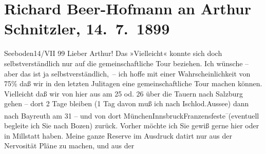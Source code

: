 

               \section[Richard Beer-Hofmann an Arthur Schnitzler, 14. 7. 1899]{ Richard Beer-Hofmann an Arthur Schnitzler, 14. 7. 1899}\nopagebreak{}\rehead{ }\begin{ledgroupsized}[t]{13cm}\normalsize\beginnumbering{} \toendnotes[C]{\smallbreak\pagebreak[2]} 
\toendnotes[C]{\smallbreak}\pstart
           \centering{}{\pb}Seeboden14/VII 99\pend
           \pstart
           Lieber Arthur! Das »Vielleicht« konnte sich doch selbstverständlich
               nur auf die gemeinschaftliche Tour beziehen. Ich wünsche – aber das ist ja
               selbstverständlich, – ich hoffe mit einer Wahrscheinlichkeit von 75{\%} daß wir in den letzten Julitagen eine gemeinschaftliche
               Tour machen können. Vielleicht daß wir von hier aus {\pb}am 25 od.
                  26 über die Tauern nach Salzburg gehen – dort 2 Tage bleiben (1 Tag davon muß ich nach
                  Ischl\introOben{}od.\introOben{}{ }Aussee) dann nach Bayreuth am 31 – und von dort MünchenInnsbruckFranzensfeste\substVorne{}\textsuperscript{–}\substDazwischen{}(\substHinten{}eventuell begleite ich Sie nach Bozen\introOben{})\introOben{} zurück. Vorher möchte ich Sie gewiß gerne hier oder in Millstatt haben.\pend
           \pstart
           Meine ganze Reserve im Ausdruck datirt nur aus der Nervosi{\pb}tät Pläne zu machen, und aus der

\end{ledgroupsized}
